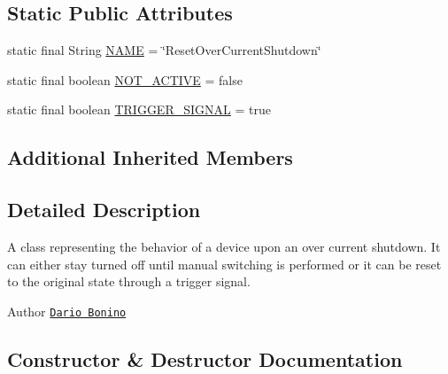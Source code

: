 \subsection*{Static Public Attributes}
\begin{DoxyCompactItemize}
\item 
static final String \hyperlink{classit_1_1polito_1_1elite_1_1enocean_1_1enj_1_1eep_1_1eep26_1_1attributes_1_1_e_e_p26_over_current_shutdown_reset_accc08f78dabb2d00270132686c4159f2}{N\+A\+ME} = \char`\"{}Reset\+Over\+Current\+Shutdown\char`\"{}
\item 
static final boolean \hyperlink{classit_1_1polito_1_1elite_1_1enocean_1_1enj_1_1eep_1_1eep26_1_1attributes_1_1_e_e_p26_over_current_shutdown_reset_af949a557982d3088196708c9596b1edd}{N\+O\+T\+\_\+\+A\+C\+T\+I\+VE} = false
\item 
static final boolean \hyperlink{classit_1_1polito_1_1elite_1_1enocean_1_1enj_1_1eep_1_1eep26_1_1attributes_1_1_e_e_p26_over_current_shutdown_reset_a3e2bf6e7902ed9dfb5a809099bd57ce7}{T\+R\+I\+G\+G\+E\+R\+\_\+\+S\+I\+G\+N\+AL} = true
\end{DoxyCompactItemize}
\subsection*{Additional Inherited Members}


\subsection{Detailed Description}
A class representing the behavior of a device upon an over current shutdown. It can either stay turned off until manual switching is performed or it can be reset to the original state through a trigger signal.

\begin{DoxyAuthor}{Author}
\href{mailto:dario.bonino@gmail.com}{\tt Dario Bonino} 
\end{DoxyAuthor}


\subsection{Constructor \& Destructor Documentation}
\hypertarget{classit_1_1polito_1_1elite_1_1enocean_1_1enj_1_1eep_1_1eep26_1_1attributes_1_1_e_e_p26_over_current_shutdown_reset_a94bd725eee1517b14c3a79fc486f8dd6}{}\label{classit_1_1polito_1_1elite_1_1enocean_1_1enj_1_1eep_1_1eep26_1_1attributes_1_1_e_e_p26_over_current_shutdown_reset_a94bd725eee1517b14c3a79fc486f8dd6} 
